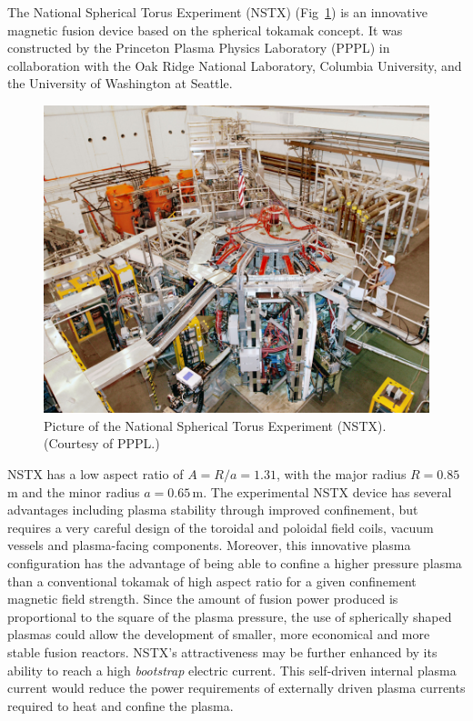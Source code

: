\documentclass[12pt,lot, lof]{puthesis}
\begin{document}
The National Spherical Torus Experiment (NSTX)  (Fig~\ref{nstx2}) is an innovative magnetic fusion device based on the spherical tokamak concept. It was constructed by the Princeton Plasma Physics Laboratory (PPPL) in collaboration with the Oak Ridge National Laboratory, Columbia University, and the University of Washington at Seattle.

\begin{figure}[htbp]
	\centering
	\includegraphics[width= 0.9\linewidth]{nstx2}
	\caption{Picture of the National Spherical Torus Experiment (NSTX). (Courtesy of PPPL.)}
	\label{nstx2}
\end{figure}

NSTX has a low aspect ratio of $A= R/a =1.31$, with the major radius $R =0.85$\,m and the minor radius $a =0.65$\,m.
The experimental NSTX device has several advantages including plasma stability through improved confinement, but requires a very careful design of the toroidal and poloidal field coils, vacuum vessels and plasma-facing components. Moreover, this innovative plasma configuration has the advantage of being able to confine a higher pressure plasma than a conventional tokamak of high aspect ratio for a given confinement magnetic field strength. Since the amount of fusion power produced is proportional to the square of the plasma pressure, the use of spherically shaped plasmas could allow the development of smaller, more economical and more stable fusion reactors. NSTX's attractiveness may be further enhanced by its ability to reach a high \emph{bootstrap} electric current. This self-driven internal plasma current would reduce the power requirements of externally driven plasma currents required to heat and confine the plasma.
\end{document}
